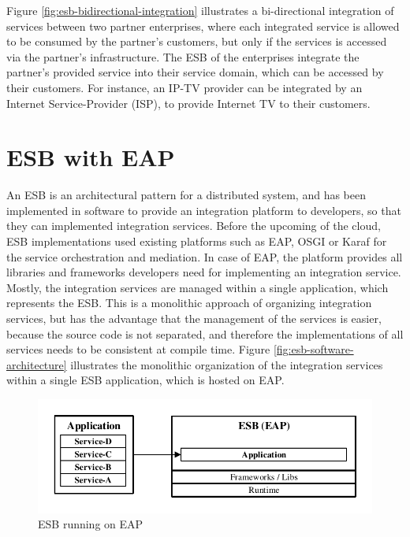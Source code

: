 Figure \vref{fig:esb-bidirectional-integration} illustrates a bi-directional integration of services between two partner enterprises, where each integrated service is allowed to be consumed by the partner's customers, but only if the services is accessed via the partner's infrastructure. The ESB of the enterprises integrate the partner's provided service into their service domain, which can be accessed by their customers. For instance, an IP-TV provider can be integrated by an Internet Service-Provider (ISP), to provide Internet TV to their customers. 


\section{ESB with EAP}
\label{sec:esb-as-software}
An ESB is an architectural pattern for a distributed system, and has been implemented in software to provide an integration platform to developers, so that they can implemented integration services. Before the upcoming of the cloud, ESB implementations used existing platforms such as EAP, OSGI or Karaf for the service orchestration and mediation. In case of EAP, the platform provides all libraries and frameworks developers need for implementing an integration service. Mostly, the integration services are managed within a single application, which represents the ESB. This is a monolithic approach of organizing integration services, but has the advantage that the management of the services is easier, because the source code is not separated, and therefore the implementations of all services needs to be consistent at compile time. Figure \vref{fig:esb-software-architecture} illustrates the monolithic organization of the integration services within a single ESB application, which is hosted on EAP.

\begin{figure}[htbp]
	\centering
	\includegraphics[scale=1]{images/esb-software-architecture.pdf}
	\caption{ESB running on EAP}
	\label{fig:esb-software-architecture}
\end{figure} 

